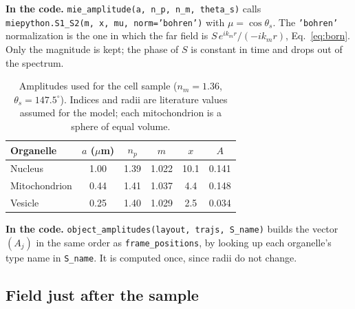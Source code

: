 \documentclass[11pt,a4paper]{article}
\newcommand{\ee}{e}
\newcommand{\code}[1]{\texttt{\small #1}}
\newcommand{\incode}[1]{\par\smallskip\noindent\colorbox{black!6}{\parbox{\dimexpr\linewidth-2\fboxsep}{\small\textbf{In the code.} #1}}\par\smallskip}
\begin{document}
\incode{\code{mie\_amplitude(a, n\_p, n\_m, theta\_s)} calls
\code{miepython.S1\_S2(m, x, mu, norm='bohren')} with $\mu = \cos\theta_s$.
The \code{'bohren'} normalization is the one in which the far field is
$S\,\ee^{ik_mr}/(-ik_mr)$, Eq.~\eqref{eq:born}. Only the magnitude is kept; the
phase of $S$ is constant in time and drops out of the spectrum.}

\begin{table}[ht]
\centering
\small
\caption{Amplitudes used for the cell sample ($n_m = 1.36$, $\theta_s = 147.5^\circ$).
Indices and radii are literature values assumed for the model; each
mitochondrion is a sphere of equal volume.}
\label{tab:mie}
\begin{tabular}{@{}lccccc@{}}
\toprule
Organelle & $a$ ($\mu$m) & $n_p$ & $m$ & $x$ & $A$ \\
\midrule
Nucleus & 1.00 & 1.39 & 1.022 & 10.1 & 0.141 \\
Mitochondrion & 0.44 & 1.41 & 1.037 & 4.4 & 0.148 \\
Vesicle & 0.25 & 1.40 & 1.029 & 2.5 & 0.034 \\
\bottomrule
\end{tabular}
\end{table}

\incode{\code{object\_amplitudes(layout, trajs, S\_name)} builds the vector
$(A_j)$ in the same order as \code{frame\_positions}, by looking up each
organelle's type name in \code{S\_name}. It is computed once, since radii do
not change.}

\subsection{Field just after the sample}
\label{sec:after}
\end{document}

